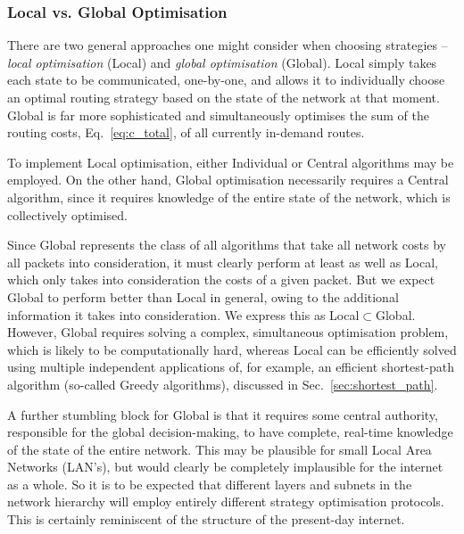 \documentclass[aps,rmp,twocolumn,amsmath,amssymb,nofootinbib,superscriptaddress]{revtex4}
\begin{document}
%
%

\subsubsection{Local vs. Global Optimisation}

There are two general approaches one might consider when choosing strategies -- \emph{local optimisation} ({\sc Local}) and \emph{global optimisation} ({\sc Global}). {\sc Local} simply takes each state to be communicated, one-by-one, and allows it to individually choose an optimal routing strategy based on the state of the network at that moment. {\sc Global} is far more sophisticated and simultaneously optimises the sum of the routing costs, Eq.~\ref{eq:c_total}, of all currently in-demand routes.

To implement {\sc Local} optimisation, either {\sc Individual} or {\sc Central} algorithms may be employed. On the other hand, {\sc Global} optimisation necessarily requires a {\sc Central} algorithm, since it requires knowledge of the entire state of the network, which is collectively optimised.

Since {\sc Global} represents the class of all algorithms that take all network costs by all packets into consideration, it must clearly perform at least as well as {\sc Local}, which only takes into consideration the costs of a given packet. But we expect {\sc Global} to perform better than {\sc Local} in general, owing to the additional information it takes into consideration. We express this as \mbox{{\sc Local}$\subset${\sc Global}}. However, {\sc Global} requires solving a complex, simultaneous optimisation problem, which is likely to be computationally hard, whereas {\sc Local} can be efficiently solved using multiple independent applications of, for example, an efficient shortest-path algorithm (so-called {\sc Greedy} algorithms), discussed in Sec.~\ref{sec:shortest_path}.

A further stumbling block for {\sc Global} is that it requires some central authority, responsible for the global decision-making, to have complete, real-time knowledge of the state of the entire network. This may be plausible for small Local Area Networks (LAN's), but would clearly be completely implausible for the internet as a whole. So it is to be expected that different layers and subnets in the network hierarchy will employ entirely different strategy optimisation protocols. This is certainly reminiscent of the structure of the present-day internet.
\end{document}
